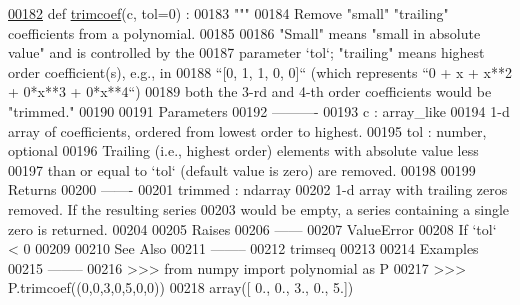 \begin{DoxyCode}
\hypertarget{namespacepyneb_1_1utils_1_1polyutils_l00182}{}\hyperlink{namespacepyneb_1_1utils_1_1polyutils_a505e3038cfd08b7f444ecca2234daa46}{00182} \textcolor{keyword}{def }\hyperlink{namespacepyneb_1_1utils_1_1polyutils_a505e3038cfd08b7f444ecca2234daa46}{trimcoef}(c, tol=0) :
00183     \textcolor{stringliteral}{"""}
00184 \textcolor{stringliteral}{    Remove "small" "trailing" coefficients from a polynomial.}
00185 \textcolor{stringliteral}{}
00186 \textcolor{stringliteral}{    "Small" means "small in absolute value" and is controlled by the}
00187 \textcolor{stringliteral}{    parameter `tol`; "trailing" means highest order coefficient(s), e.g., in}
00188 \textcolor{stringliteral}{    ``[0, 1, 1, 0, 0]`` (which represents ``0 + x + x**2 + 0*x**3 + 0*x**4``)}
00189 \textcolor{stringliteral}{    both the 3-rd and 4-th order coefficients would be "trimmed."}
00190 \textcolor{stringliteral}{}
00191 \textcolor{stringliteral}{    Parameters}
00192 \textcolor{stringliteral}{    ----------}
00193 \textcolor{stringliteral}{    c : array\_like}
00194 \textcolor{stringliteral}{        1-d array of coefficients, ordered from lowest order to highest.}
00195 \textcolor{stringliteral}{    tol : number, optional}
00196 \textcolor{stringliteral}{        Trailing (i.e., highest order) elements with absolute value less}
00197 \textcolor{stringliteral}{        than or equal to `tol` (default value is zero) are removed.}
00198 \textcolor{stringliteral}{}
00199 \textcolor{stringliteral}{    Returns}
00200 \textcolor{stringliteral}{    -------}
00201 \textcolor{stringliteral}{    trimmed : ndarray}
00202 \textcolor{stringliteral}{        1-d array with trailing zeros removed.  If the resulting series}
00203 \textcolor{stringliteral}{        would be empty, a series containing a single zero is returned.}
00204 \textcolor{stringliteral}{}
00205 \textcolor{stringliteral}{    Raises}
00206 \textcolor{stringliteral}{    ------}
00207 \textcolor{stringliteral}{    ValueError}
00208 \textcolor{stringliteral}{        If `tol` < 0}
00209 \textcolor{stringliteral}{}
00210 \textcolor{stringliteral}{    See Also}
00211 \textcolor{stringliteral}{    --------}
00212 \textcolor{stringliteral}{    trimseq}
00213 \textcolor{stringliteral}{}
00214 \textcolor{stringliteral}{    Examples}
00215 \textcolor{stringliteral}{    --------}
00216 \textcolor{stringliteral}{    >>> from numpy import polynomial as P}
00217 \textcolor{stringliteral}{    >>> P.trimcoef((0,0,3,0,5,0,0))}
00218 \textcolor{stringliteral}{    array([ 0.,  0.,  3.,  0.,  5.])}

\end{DoxyCode}
